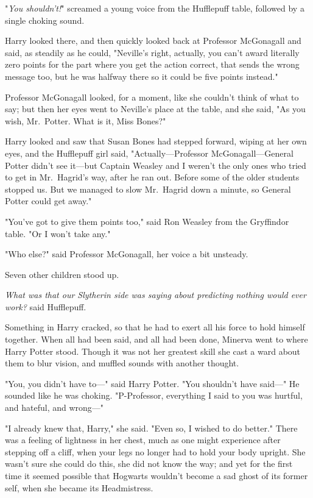 "\emph{You shouldn't!}" screamed a young voice from the Hufflepuff table, 
followed by a single choking sound.

Harry looked there, and then quickly looked back at Professor McGonagall and 
said, as steadily as he could, "Neville's right, actually, you can't award 
literally zero points for the part where you get the action correct, that sends 
the wrong message too, but he was halfway there so it could be five points 
instead."

Professor McGonagall looked, for a moment, like she couldn't think of what to 
say; but then her eyes went to Neville's place at the table, and she said, "As 
you wish, Mr.~Potter. What is it, Miss Bones?"

Harry looked and saw that Susan Bones had stepped forward, wiping at her own 
eyes, and the Hufflepuff girl said, "Actually---Professor McGonagall---General 
Potter didn't see it---but Captain Weasley and I weren't the only ones who 
tried to get in Mr.~Hagrid's way, after he ran out. Before some of the older 
students stopped us. But we managed to slow Mr.~Hagrid down a minute, so 
General Potter could get away."

"You've got to give them points too," said Ron Weasley from the Gryffindor 
table. "Or I won't take any."

"Who else?" said Professor McGonagall, her voice a bit unsteady.

Seven other children stood up.

\emph{What was that our Slytherin side was saying about predicting nothing 
would ever work?} said Hufflepuff.

Something in Harry cracked, so that he had to exert all his force to hold 
himself together.
\sbreak
When all had been said, and all had been done, Minerva went to where Harry 
Potter stood. Though it was not her greatest skill she cast a ward about them 
to blur vision, and muffled sounds with another thought.

"You, you didn't have to---" said Harry Potter. "You shouldn't have said---" He 
sounded like he was choking. "P-Professor, everything I said to you was 
hurtful, and hateful, and wrong---"

"I already knew that, Harry," she said. "Even so, I wished to do better." There 
was a feeling of lightness in her chest, much as one might experience after 
stepping off a cliff, when your legs no longer had to hold your body upright. 
She wasn't sure she could do this, she did not know the way; and yet for the 
first time it seemed possible that Hogwarts wouldn't become a sad ghost of its 
former self, when she became its Headmistress.

